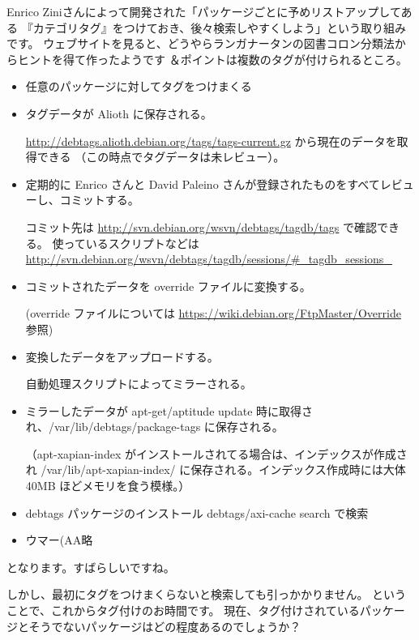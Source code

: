 \documentclass[mingoth,a4paper]{jsarticle}
\begin{document}
Enrico Ziniさんによって開発された「パッケージごとに予めリストアップしてある
『カテゴリタグ』をつけておき、後々検索しやすくしよう」という取り組みです。
ウェブサイトを見ると、どうやらランガナータンの図書コロン分類法からヒントを得て作ったようです
＆ポイントは複数のタグが付けられるところ。


\begin{itemize}
  \item 任意のパッケージに対してタグをつけまくる

  \item タグデータが Alioth に保存される。
  
        \url{http://debtags.alioth.debian.org/tags/tags-current.gz} から現在のデータを取得できる
        （この時点でタグデータは未レビュー）。

  \item 定期的に Enrico さんと David Paleino さんが登録されたものをすべてレビューし、コミットする。

        コミット先は \url{http://svn.debian.org/wsvn/debtags/tagdb/tags} で確認できる。
        使っているスクリプトなどは \url{http://svn.debian.org/wsvn/debtags/tagdb/sessions/#_tagdb_sessions_} 

  \item コミットされたデータを override ファイルに変換する。

         (override ファイルについては \url{https://wiki.debian.org/FtpMaster/Override} 参照)

  \item 変換したデータをアップロードする。
  
        自動処理スクリプトによってミラーされる。

  \item ミラーしたデータが apt-get/aptitude update 時に取得され、/var/lib/debtags/package-tags に保存される。
  
        （apt-xapian-index がインストールされてる場合は、インデックスが作成され /var/lib/apt-xapian-index/ 
        に保存される。インデックス作成時には大体 40MB ほどメモリを食う模様。）

  \item debtags パッケージのインストール
        debtags/axi-cache search で検索

  \item ウマー(AA略
\end{itemize}

となります。すばらしいですね。

しかし、最初にタグをつけまくらないと検索しても引っかかりません。
ということで、これからタグ付けのお時間です。
現在、タグ付けされているパッケージとそうでないパッケージはどの程度あるのでしょうか？
\end{document}
